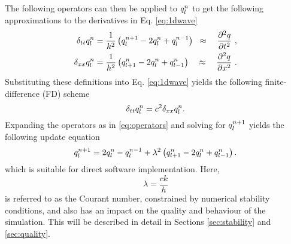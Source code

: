 The following operators can then be applied to $q_l^n$ to get the following approximations to the derivatives in Eq. \eqref{eq:1dwave}
\begin{subequations}\label{eq:operators}
    \begin{align}
         \delta_{tt}q_l^n &= \frac{1}{k^2}\left(q_l^{n+1}-2q_l^n + q_l^{n-1}\right)\;\;\approx\quad\frac{\partial^2q}{\partial t^2}\label{eq:secondOrderTime}\ ,\\
         \delta_{xx}q_l^n &= \frac{1}{h^2}\left(q_{l+1}^n-2q_l^n + q_{l-1}^n\right)\quad\approx\quad \frac{\partial^2q}{\partial x^2}\ .\label{eq:secondOrderSpace}
    \end{align}
\end{subequations}
Substituting these definitions into Eq. \eqref{eq:1dwave} yields the following finite-difference (FD) scheme
\begin{equation}\label{eq:FDS}
    \delta_{tt}q_l^n = c^2 \delta_{xx}q_l^n.
\end{equation}
%
Expanding the operators as in %
\eqref{eq:operators} and solving for $q_l^{n+1}$ yields the following update equation
\begin{equation}\label{eq:updateEq}
    q_l^{n+1} = 2q_l^n-q_l^{n-1} + \lambda^2 \left(q_{l+1}^n-2q_l^n + q_{l-1}^n\right).
\end{equation}
which is suitable for direct software implementation. %
Here,
\begin{equation}\label{eq:lambdaDef}
    \lambda = \frac{ck}{h}
\end{equation}
is referred to as the Courant number, constrained by numerical stability conditions, and also has an impact on the quality and behaviour of the simulation. This will be described in detail in Sections \ref{sec:stability} and \ref{sec:quality}.

